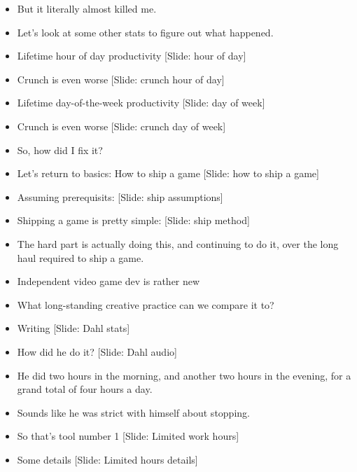\documentclass[12pt]{article}
\begin{document}
{\begin{itemize}
\item But it literally almost killed me.

\item Let's look at some other stats to figure out what happened.

\item Lifetime hour of day productivity [Slide: hour of day]

\item Crunch is even worse [Slide: crunch hour of day]

\item Lifetime day-of-the-week productivity [Slide: day of week]

\item Crunch is even worse [Slide: crunch day of week]

\item So, how did I fix it?

\item Let's return to basics:  How to ship a game [Slide: how to ship a game]

\item Assuming prerequisits:  [Slide: ship assumptions]

\item Shipping a game is pretty simple:  [Slide: ship method]

\item The hard part is actually doing this, and continuing to do it, over the long haul required to ship a game.

\item Independent video game dev is rather new

\item What long-standing creative practice can we compare it to?

\item Writing [Slide:  Dahl stats]

\item How did he do it? [Slide:  Dahl audio]

\item He did two hours in the morning, and another two hours in the evening, for a grand total of four hours a day.

\item Sounds like he was strict with himself about stopping.

\item So that's tool number 1 [Slide:  Limited work hours]

\item Some details [Slide: Limited hours details]


\end{itemize}}
\end{document}
